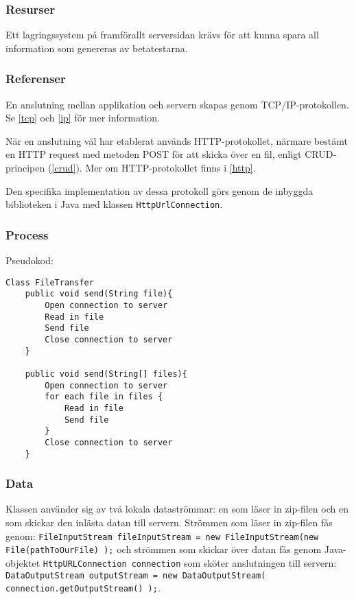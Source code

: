 \subsubsection{Resurser}
Ett lagringssystem på framförallt serversidan krävs för att kunna spara all information som genereras av betatestarna. 

\subsubsection{Referenser}
En anslutning mellan applikation och servern skapas genom TCP/IP-protokollen. Se \ref{tcp} och \ref{ip} för mer information. 

När en anslutning väl har etablerat används HTTP-protokollet, närmare bestämt en HTTP request med metoden POST för att skicka över en fil, enligt CRUD-principen (\ref{crud}). Mer om HTTP-protokollet finns i \ref{http}.

Den specifika implementation av dessa protokoll görs genom de inbyggda biblioteken i Java med klassen \verb:HttpUrlConnection:. 

\subsubsection{Process}
Pseudokod: 
\begin{verbatim}
Class FileTransfer
	public void send(String file){
		Open connection to server
		Read in file
		Send file
		Close connection to server
	}
	
	public void send(String[] files){
		Open connection to server
		for each file in files {
			Read in file
			Send file		
		}
		Close connection to server
	}
\end{verbatim}

\subsubsection{Data}
Klassen använder sig av två lokala dataströmmar: en som läser in zip-filen och en som skickar den inlästa datan till servern. Strömmen som läser in zip-filen fås genom: \verb:FileInputStream fileInputStream = new FileInputStream(new File(pathToOurFile) );: och strömmen som skickar över datan fås genom Java-objektet \verb:HttpURLConnection connection: som sköter anslutningen till servern: \verb:DataOutputStream outputStream = new DataOutputStream( connection.getOutputStream() );:. 